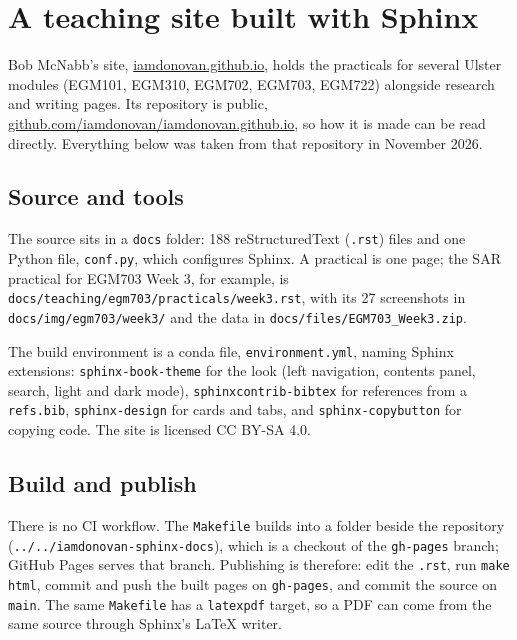 \chapter{A teaching site built with Sphinx}

Bob McNabb's site, \href{https://iamdonovan.github.io}{iamdonovan.github.io}, holds the practicals for several Ulster modules (EGM101, EGM310, EGM702, EGM703, EGM722) alongside research and writing pages. Its repository is public, \href{https://github.com/iamdonovan/iamdonovan.github.io}{github.com/iamdonovan/iamdonovan.github.io}, so how it is made can be read directly. Everything below was taken from that repository in November 2026.

\section{Source and tools}

The source sits in a \texttt{docs} folder: 188 reStructuredText (\texttt{.rst}) files and one Python file, \texttt{conf.py}, which configures Sphinx. A practical is one page; the SAR practical for EGM703 Week 3, for example, is \texttt{docs/teaching/egm703/practicals/week3.rst}, with its 27 screenshots in \texttt{docs/img/egm703/week3/} and the data in \texttt{docs/files/EGM703\_Week3.zip}.

The build environment is a conda file, \texttt{environment.yml}, naming Sphinx extensions: \texttt{sphinx-book-theme} for the look (left navigation, contents panel, search, light and dark mode), \texttt{sphinxcontrib-bibtex} for references from a \texttt{refs.bib}, \texttt{sphinx-design} for cards and tabs, and \texttt{sphinx-copybutton} for copying code. The site is licensed CC BY-SA 4.0.

\section{Build and publish}

There is no CI workflow. The \texttt{Makefile} builds into a folder beside the repository (\texttt{../../iamdonovan-sphinx-docs}), which is a checkout of the \texttt{gh-pages} branch; GitHub Pages serves that branch. Publishing is therefore: edit the \texttt{.rst}, run \texttt{make html}, commit and push the built pages on \texttt{gh-pages}, and commit the source on \texttt{main}. The same \texttt{Makefile} has a \texttt{latexpdf} target, so a PDF can come from the same source through Sphinx's LaTeX writer.

